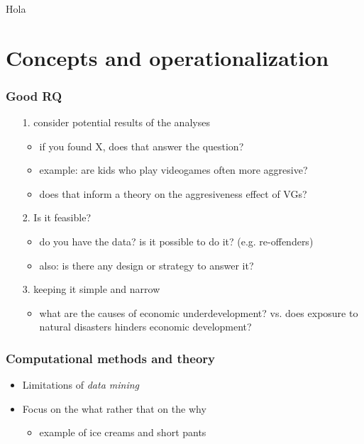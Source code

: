 \documentclass[aspectratio=43]{beamer}
\begin{document}
\begin{frame}
\frametitle{}
\centering

Hola

\end{frame}

\section{Concepts and operationalization}

\begin{frame}
\frametitle{Good RQ}
\centering

\begin{itemize}
  \item[1.] consider potential results of the analyses
  \begin{itemize}
    \item if you found X, does that answer the question?
    \item example: are kids who play videogames often more aggresive?
    \item does that inform a theory on the aggresiveness effect of VGs?
  \end{itemize}
  \item[2.] Is it feasible?
  \begin{itemize}
    \item do you have the data? is it possible to do it? (e.g. re-offenders)
    \item also: is there any design or strategy to answer it?
  \end{itemize}
  \item[3.] keeping it simple and narrow
  \begin{itemize}
    \item what are the causes of economic underdevelopment? vs. does exposure to natural disasters hinders economic development?
  \end{itemize}
\end{itemize}

\end{frame}


\begin{frame}
\frametitle{Computational methods and theory}
\centering

\begin{itemize}
  \item Limitations of \textit{data mining}
  \item Focus on the what rather that on the why
  \begin{itemize}
    \item example of ice creams and short pants
  \end{itemize}
\end{itemize}

\end{frame}
\end{document}
